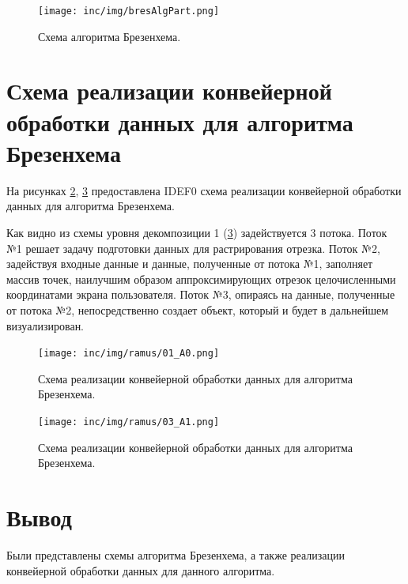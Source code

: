 \documentclass[12pt]{report}
\begin{document}
\begin{figure}
\begin{center}
\texttt{[image: inc/img/bresAlgPart.png]}
\captionsetup{justification=centering}
	\caption{Схема алгоритма Брезенхема.}
	\label{img:bresAlgPart}	
\end{center}
\end{figure}

\newpage

\section{Схема реализации конвейерной обработки данных для алгоритма Брезенхема}
На рисунках \ref{img:conveyor}, \ref{img:conveyor:2} предоставлена IDEF0 схема реализации конвейерной обработки данных для алгоритма Брезенхема.

Как видно из схемы уровня декомпозиции 1 (\ref{img:conveyor:2}) задействуется 3 потока. Поток №1 решает задачу подготовки данных для растрирования отрезка. Поток №2, задействуя входные данные и данные, полученные от потока №1, заполняет массив точек, наилучшим образом аппроксимирующих отрезок целочисленными координатами экрана пользователя. Поток №3, опираясь на данные, полученные от потока №2, непосредственно создает объект, который и будет в дальнейшем визуализирован.

\begin{figure}[ht]
\begin{center}
\texttt{[image: inc/img/ramus/01\_A0.png]}
\captionsetup{justification=centering}
	\caption{Схема реализации конвейерной обработки данных для алгоритма Брезенхема.}
	\label{img:conveyor}	
\end{center}
\end{figure}

\newpage

\begin{figure}[ht]
\begin{center}
\texttt{[image: inc/img/ramus/03\_A1.png]}
\captionsetup{justification=centering}
	\caption{Схема реализации конвейерной обработки данных для алгоритма Брезенхема.}
	\label{img:conveyor:2}	
\end{center}
\end{figure}

\newpage

\section*{Вывод}
Были представлены схемы алгоритма Брезенхема, а также реализации конвейерной обработки данных для данного алгоритма.
\end{document}
